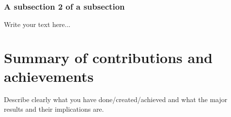 \subsubsection{A subsection 2 of a subsection}
\label{sec:intro_some_subsub2}
Write your text here...

\section{Summary of contributions and achievements} %
\label{sec:intro_sum_results} %
Describe clearly what you have done/created/achieved and what the major results and their implications are. 



